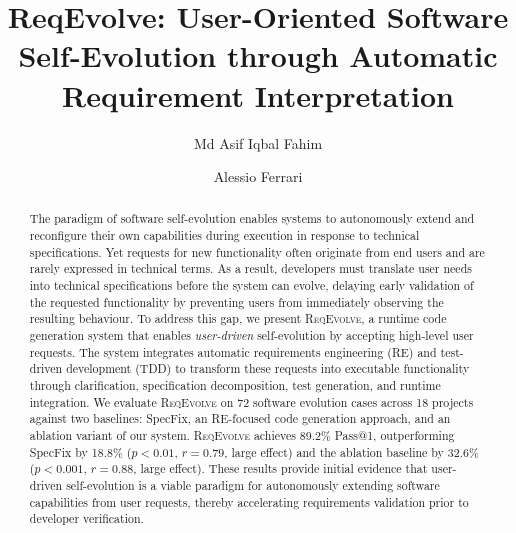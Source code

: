 \documentclass[sigconf,screen]{acmart}
\begin{document}
\title{ReqEvolve: User-Oriented Software Self-Evolution through Automatic Requirement Interpretation}

\author{Md Asif Iqbal Fahim}

\author{Alessio Ferrari}

\begin{abstract}
The paradigm of software self-evolution enables systems to autonomously extend and reconfigure their own capabilities during execution in response to technical specifications. Yet requests for new functionality often originate from end users and are rarely expressed in technical terms. As a result, developers must translate user needs into technical specifications before the system can evolve, delaying early validation of the requested functionality by preventing users from immediately observing the resulting behaviour. To address this gap, we present \textsc{ReqEvolve}, a runtime code generation system that enables \textit{user-driven} self-evolution by accepting high-level user requests. The system integrates automatic requirements engineering (RE) and test-driven development (TDD) to transform these requests into executable functionality through clarification, specification decomposition, test generation, and runtime integration. We evaluate \textsc{ReqEvolve} on 72 software evolution cases across 18 projects against two baselines: SpecFix, an RE-focused code generation approach, and an ablation variant of our system.
\textsc{ReqEvolve} achieves 89.2\% Pass@1, outperforming SpecFix by 18.8\% ($p < 0.01$, $r = 0.79$, large effect) and the ablation baseline by 32.6\% ($p < 0.001$, $r = 0.88$, large effect).
These results provide initial evidence that user-driven self-evolution is a viable paradigm for autonomously extending software capabilities from user requests, thereby accelerating requirements validation prior to developer verification.
\end{abstract}
\end{document}
